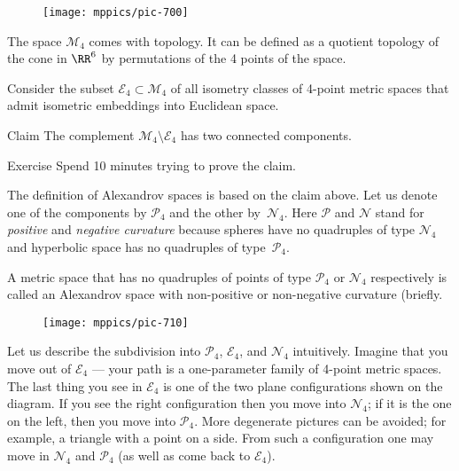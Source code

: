 {

\begin{wrapfigure}{o}{33mm}
\vskip-3mm
\centering
\texttt{[image: mppics/pic-700]}
\end{wrapfigure}

The space $\mathcal{M}_4$ comes with topology.
It can be defined as a quotient topology of the cone in $\RR^6$ by permutations of the 4 points of the space.

Consider the subset $\mathcal{E}_4\subset \mathcal{M}_4$ of all isometry classes of 4-point metric spaces that admit isometric embeddings into Euclidean space.

}

\begin{thm}{Claim}\label{clm:two-components-of-M4}
The complement $\mathcal{M}_4\setminus \mathcal{E}_4$ has two connected components.
\end{thm}

\begin{thm}{Exercise}
Spend 10 minutes trying to prove the claim.
\end{thm}


The definition of Alexandrov spaces is based on the claim above.
Let us denote one of the components by $\mathcal{P}_4$ and the other by~$\mathcal{N}_4$.
Here $\mathcal{P}$ and $\mathcal{N}$ stand for {}\emph{positive} 
and {}\emph{negative curvature} because spheres have no quadruples of type $\mathcal{N}_4$ and 
hyperbolic space
has no quadruples of type~$\mathcal{P}_4$.

A metric space that has no quadruples of points of type $\mathcal{P}_4$ or $\mathcal{N}_4$
respectively 
is called an Alexandrov space with non-positive or non-negative curvature (briefly.

\begin{wrapfigure}{r}{33mm}
\vskip-0mm
\centering
\texttt{[image: mppics/pic-710]}
\end{wrapfigure}

Let us describe the subdivision into  $\mathcal{P}_4$, $\mathcal{E}_4$, and $\mathcal{N}_4$ intuitively.
Imagine that you move out of $\mathcal{E}_4$ --- your path is a one-parameter family of 4-point metric spaces.
The last thing you see in $\mathcal{E}_4$ is one of the two plane configurations shown on the diagram.
If you see the right configuration then you move into $\mathcal{N}_4$;
if it is the one on the left, then you move into $\mathcal{P}_4$.
More degenerate pictures can be avoided; for example, a triangle with a point on a side.
From such a configuration one may move in $\mathcal{N}_4$ and $\mathcal{P}_4$ (as well as come back to $\mathcal{E}_4$).

